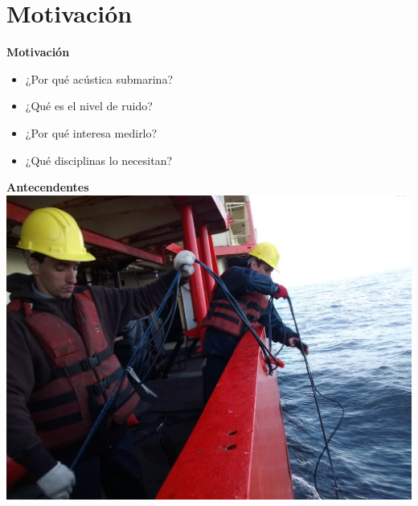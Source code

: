 \documentclass[11pt, xcolor={table,xcdraw}]{beamer}
\begin{document}
\section{Motivación}

\begin{frame}{\textbf{\LARGE{Motivación}}}
\fontsize{18pt}{18}\selectfont
	\vspace{-.7cm}
	\centering
	\begin{itemize}
	\item ¿Por qué acústica submarina?
	\vspace{15px}
	\item ¿Qué es el nivel de ruido?
	\vspace{15px}
	\item ¿Por qué interesa medirlo?
	\vspace{15px}	
	\item ¿Qué disciplinas lo necesitan?
	\end{itemize}
\end{frame}

\begin{frame}{\textbf{\LARGE{Antecendentes}}}
	\vspace{-.6cm}
		\includegraphics[width=.9\textwidth]{./imagenes/antecedentes.jpg}
\end{frame}
\end{document}

